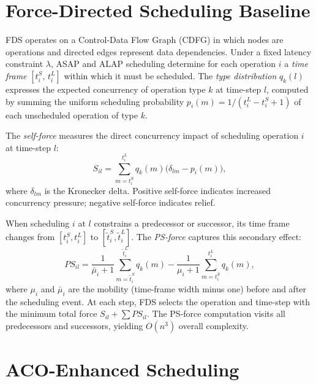 \documentclass[conference]{IEEEtran}
\begin{document}
\section{Force-Directed Scheduling Baseline}

FDS operates on a Control-Data Flow Graph (CDFG) in which nodes are
operations and directed edges represent data dependencies. Under a fixed
latency constraint $\lambda$, ASAP and ALAP scheduling determine for each
operation $i$ a \emph{time frame} $[t_{i}^{S},\, t_{i}^{L}]$ within
which it must be scheduled. The \emph{type distribution} $q_{k}(l)$
expresses the expected concurrency of operation type $k$ at time-step $l$,
computed by summing the uniform scheduling probability $p_{i}(m) =
1/(t_{i}^{L} - t_{i}^{S} + 1)$ of each unscheduled operation of type $k$.

The \emph{self-force} measures the direct concurrency impact of
scheduling operation $i$ at time-step $l$:
\begin{equation}
  S_{il} = \sum_{m = t_{i}^{S}}^{t_{i}^{L}}
            q_{k}(m)\bigl(\delta_{lm} - p_{i}(m)\bigr),
  \label{eq:selfforce}
\end{equation}
where $\delta_{lm}$ is the Kronecker delta. Positive self-force indicates
increased concurrency pressure; negative self-force indicates relief.

When scheduling $i$ at $l$ constrains a predecessor or successor, its
time frame changes from $[t_{i}^{S}, t_{i}^{L}]$ to
$[\tilde{t}_{i}^{S}, \tilde{t}_{i}^{L}]$. The \emph{PS-force} captures
this secondary effect:
\begin{equation}
  PS_{il} = \frac{1}{\bar{\mu}_{i}+1}\sum_{m=\tilde{t}_{i}^{S}}^{\tilde{t}_{i}^{L}}
              q_{k}(m)
            - \frac{1}{\mu_{i}+1}\sum_{m=t_{i}^{S}}^{t_{i}^{L}}
              q_{k}(m),
  \label{eq:psforce}
\end{equation}
where $\mu_{i}$ and $\bar{\mu}_{i}$ are the mobility (time-frame width
minus one) before and after the scheduling event. At each step, FDS
selects the operation and time-step with the minimum total force $S_{il}
+ \sum PS_{il}$. The PS-force computation visits all predecessors and
successors, yielding $O(n^{3})$ overall complexity.

\section{ACO-Enhanced Scheduling}
\end{document}
